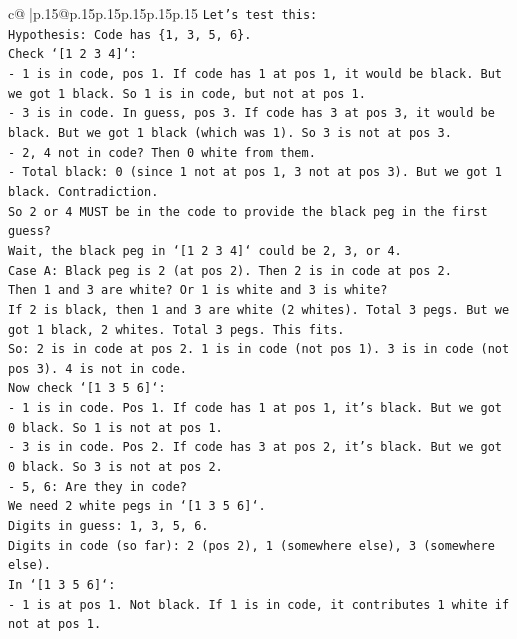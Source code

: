 \documentclass{article}
\begin{document}
{\begin{supertabular}{c@{$\;$}|p{.15\linewidth}@{}p{.15\linewidth}p{.15\linewidth}p{.15\linewidth}p{.15\linewidth}p{.15\linewidth}}
{{{\texttt{Let's test this:} \\
\texttt{Hypothesis: Code has \{1, 3, 5, 6\}.} \\
\texttt{Check `{[}1 2 3 4{]}`:} \\
\texttt{{-} 1 is in code, pos 1. If code has 1 at pos 1, it would be black. But we got 1 black. So 1 is in code, but not at pos 1.} \\
\texttt{{-} 3 is in code. In guess, pos 3. If code has 3 at pos 3, it would be black. But we got 1 black (which was 1). So 3 is not at pos 3.} \\
\texttt{{-} 2, 4 not in code? Then 0 white from them.} \\
\texttt{{-} Total black: 0 (since 1 not at pos 1, 3 not at pos 3). But we got 1 black. Contradiction.} \\
\texttt{So 2 or 4 MUST be in the code to provide the black peg in the first guess?} \\
\texttt{Wait, the black peg in `{[}1 2 3 4{]}` could be 2, 3, or 4.} \\
\texttt{Case A: Black peg is 2 (at pos 2). Then 2 is in code at pos 2.} \\
\texttt{Then 1 and 3 are white? Or 1 is white and 3 is white?} \\
\texttt{If 2 is black, then 1 and 3 are white (2 whites). Total 3 pegs. But we got 1 black, 2 whites. Total 3 pegs. This fits.} \\
\texttt{So: 2 is in code at pos 2. 1 is in code (not pos 1). 3 is in code (not pos 3). 4 is not in code.} \\
\texttt{Now check `{[}1 3 5 6{]}`:} \\
\texttt{{-} 1 is in code. Pos 1. If code has 1 at pos 1, it's black. But we got 0 black. So 1 is not at pos 1.} \\
\texttt{{-} 3 is in code. Pos 2. If code has 3 at pos 2, it's black. But we got 0 black. So 3 is not at pos 2.} \\
\texttt{{-} 5, 6: Are they in code?} \\
\texttt{We need 2 white pegs in `{[}1 3 5 6{]}`.} \\
\texttt{Digits in guess: 1, 3, 5, 6.} \\
\texttt{Digits in code (so far): 2 (pos 2), 1 (somewhere else), 3 (somewhere else).} \\
\texttt{In `{[}1 3 5 6{]}`:} \\
\texttt{{-} 1 is at pos 1. Not black. If 1 is in code, it contributes 1 white if not at pos 1.} \\
}}}
\end{supertabular}}
\end{document}
